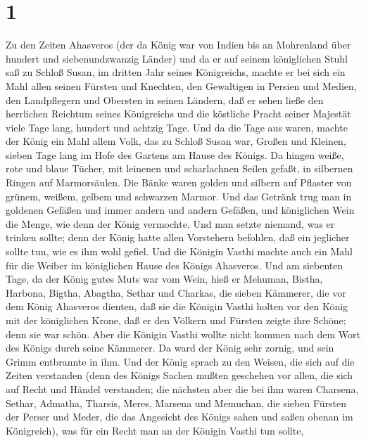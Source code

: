 \hypertarget{section}{%
\section{1}\label{section}}

 Zu den Zeiten Ahasveros (der da König war von Indien bis an
Mohrenland über hundert und siebenundzwanzig Länder)  und da
er auf seinem königlichen Stuhl saß zu Schloß Susan,  im
dritten Jahr seines Königreichs, machte er bei sich ein Mahl allen
seinen Fürsten und Knechten, den Gewaltigen in Persien und Medien, den
Landpflegern und Obersten in seinen Ländern,  daß er sehen
ließe den herrlichen Reichtum seines Königreichs und die köstliche
Pracht seiner Majestät viele Tage lang, hundert und achtzig Tage.
 Und da die Tage aus waren, machte der König ein Mahl allem
Volk, das zu Schloß Susan war, Großen und Kleinen, sieben Tage lang im
Hofe des Gartens am Hause des Königs.  Da hingen weiße, rote
und blaue Tücher, mit leinenen und scharlachnen Seilen gefaßt, in
silbernen Ringen auf Marmorsäulen. Die Bänke waren golden und silbern
auf Pflaster von grünem, weißem, gelbem und schwarzen Marmor.
 Und das Getränk trug man in goldenen Gefäßen und immer
andern und andern Gefäßen, und königlichen Wein die Menge, wie denn der
König vermochte.  Und man setzte niemand, was er trinken
sollte; denn der König hatte allen Vorstehern befohlen, daß ein
jeglicher sollte tun, wie es ihm wohl gefiel.  Und die
Königin Vasthi machte auch ein Mahl für die Weiber im königlichen Hause
des Königs Ahasveros.  Und am siebenten Tage, da der König
gutes Muts war vom Wein, hieß er Mehuman, Bistha, Harbona, Bigtha,
Abagtha, Sethar und Charkas, die sieben Kämmerer, die vor dem König
Ahasveros dienten,  daß sie die Königin Vasthi holten vor
den König mit der königlichen Krone, daß er den Völkern und Fürsten
zeigte ihre Schöne; denn sie war schön.  Aber die Königin
Vasthi wollte nicht kommen nach dem Wort des Königs durch seine
Kämmerer. Da ward der König sehr zornig, und sein Grimm entbrannte in
ihm.  Und der König sprach zu den Weisen, die sich auf die
Zeiten verstanden (denn des Königs Sachen mußten geschehen vor allen,
die sich auf Recht und Händel verstanden;  die nächsten
aber die bei ihm waren Charsena, Sethar, Admatha, Tharsis, Meres,
Marsena und Memuchan, die sieben Fürsten der Perser und Meder, die das
Angesicht des Königs sahen und saßen obenan im Königreich),
 was für ein Recht man an der Königin Vasthi tun sollte,
